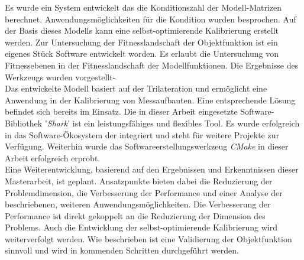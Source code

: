 Es wurde ein System entwickelt das die Konditionszahl der Modell-Matrizen berechnet. Anwendungsmöglichkeiten für die Kondition wurden besprochen. Auf der Basis dieses Modells kann eine selbst-optimierende Kalibrierung erstellt werden. Zur Untersuchung der Fitnesslandschaft der Objektfunktion ist ein eigenes Stück Software entwickelt worden. Es erlaubt die Untersuchung von Fitnessebenen in der Fitnesslandschaft der Modellfunktionen. Die Ergebnisse des Werkzeugs wurden vorgestellt- \\

Das entwickelte Modell basiert auf der Trilateration und ermöglicht eine Anwendung in der Kalibrierung von Messaufbauten. Eine entsprechende Lösung befindet sich bereits im Einsatz. Die in dieser Arbeit eingesetzte Software-Bibliothek '\textit{Shark}' ist ein leistungsfähiges und flexibles Tool. Es wurde erfolgreich in das Software-Ökosystem der \amedogmbh integriert und steht für weitere Projekte zur Verfügung. Weiterhin wurde das Softwareerstellungswerkzeug \textit{CMake} in dieser Arbeit erfolgreich erprobt.\\

Eine Weiterentwicklung, basierend auf den Ergebnissen und Erkenntnissen dieser Masterarbeit, ist geplant. Ansatzpunkte bieten dabei die Reduzierung der Problemdimension, die Verbesserung der Performance und einer Analyse der beschriebenen, weiteren Anwendungsmöglichkeiten. Die Verbesserung der Performance ist direkt gekoppelt an die Reduzierung der Dimension des Problems. Auch die Entwicklung der selbst-optimierende Kalibrierung wird weiterverfolgt werden. Wie beschrieben ist eine Validierung der Objektfunktion sinnvoll und wird in kommenden Schritten durchgeführt werden.
